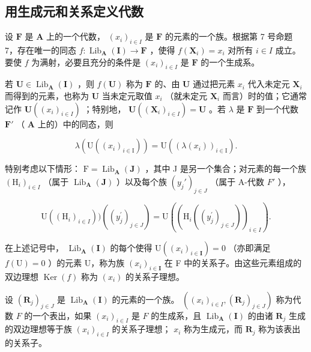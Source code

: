\subsection{用生成元和关系定义代数}

设 \(\mathbf{F}\) 是 \(\mathbf{A}\) 上的一个代数， \((x_{i})_{i\in I}\) 是 \(\mathbf{F}\) 的元素的一个族。根据第 7 号命题 7，存在唯一的同态 \(f\colon \operatorname{Lib}_{\mathbf{A}}(\mathbf{I})\to \mathbf{F}\) ，使得 \(f(\mathbf{X}_i) = x_i\) 对所有 \(i\in I\) 成立。要使 \(f\) 为满射，必要且充分的条件是 \((x_{i})_{i\in I}\) 是 \(\mathbf{F}\) 的一个生成系。

若 \(\mathbf{U} \in \operatorname{Lib}_{\mathbf{A}}(\mathbf{I})\) ，则 \(f(\mathbf{U})\) 称为 \(\mathbf{F}\) 的、由 \(\mathbf{U}\) 通过把元素 \(x_{i}\) 代入未定元 \(\mathbf{X}_{i}\) 而得到的元素，也称为 \(\mathbf{U}\) 当未定元取值 \(x_{i}\) （就未定元 \(\mathbf{X}_{i}\) 而言）时的值；它通常记作 \(\mathbf{U}((x_{i})_{i \in I})\) ；特别地， \(\mathbf{U}((\mathbf{X}_{i})_{i \in I}) = \mathbf{U}\) 。若 \(\lambda\) 是 \(\mathbf{F}\) 到一个代数 \(\mathbf{F}'\) （ \(\mathbf{A}\) 上的）中的同态，则

\[
\lambda (\mathrm{U} ((x _ {i}) _ {i \in \mathrm{I}})) = \mathrm{U} ((\lambda (x _ {i})) _ {i \in \mathrm{I}}).
\]

特别考虑以下情形： \(\mathrm{F} = \operatorname{Lib}_{\mathbf{A}}(\mathbf{J})\) ，其中 J 是另一个集合；对元素的每一个族 \((\mathrm{H}_{i})_{i \in I}\) （属于 \(\operatorname{Lib}_{\mathbf{A}}(\mathbf{J})\) ）以及每个族 \((y_{j}')_{j \in J}\) （属于 A-代数 \(F'\) ），

\[
\mathrm{U} ((\mathrm{H} _ {i}) _ {i \in I})) ((y _ {j} ^ {\prime}) _ {j \in J}) = \mathrm{U} ((\mathrm{H} _ {i} ((y _ {j} ^ {\prime}) _ {j \in J})) _ {i \in I}).\tag{37}
\]

在上述记号中， \(\operatorname{Lib}_{\mathbf{A}}(\mathbf{I})\) 的每个使得 \(\mathrm{U}((x_{i})_{i\in\mathbf{I}})=0\) （亦即满足 \(f(\mathrm{U})=0\) ）的元素 U，称为族 \((x_{i})_{i\in\mathbf{I}}\) 在 F 中的关系子。由这些元素组成的双边理想 \(\operatorname{Ker}(f)\) 称为 \((x_{i})\) 的关系子理想。

设 \((\mathbf{R}_j)_{j\in J}\) 是 \(\operatorname{Lib}_{\mathbf{A}}(\mathbf{I})\) 的元素的一个族。 \(((x_i)_{i\in I}, (\mathbf{R}_j)_{j\in J})\) 称为代数 \(F\) 的一个表出，如果 \((x_i)_{i\in I}\) 是 \(F\) 的生成系，且 \(\operatorname{Lib}_{\mathbf{A}}(\mathbf{I})\) 的由诸 \(\mathbf{R}_j\) 生成的双边理想等于族 \((x_i)_{i\in I}\) 的关系子理想； \(x_i\) 称为生成元，而 \(\mathbf{R}_j\) 称为该表出的关系子。

